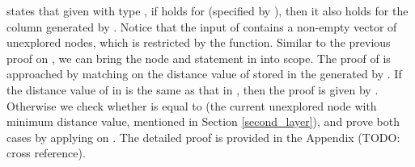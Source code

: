  states that given  with type , if  holds for  (specified by ), then it also holds for the column generated by . Notice that the input  of  contains a non-empty vector of unexplored nodes, which is restricted by the  function. Similar to the previous proof on , we can bring the node  and statement  in  into scope. The proof of  is approached by matching on the distance value of  stored in the  generated by . If the distance value of  in  is the same as that in , then the proof is given by . Otherwise we check whether  is equal to  (the current unexplored node with minimum distance value, mentioned in Section \ref{second_layer}), and prove both cases by applying  on . The detailed proof is provided in the Appendix (TODO: cross reference). 
\\
